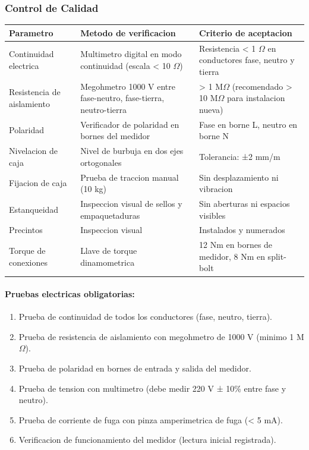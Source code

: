 \subsubsection{Control de Calidad}

\begin{longtable}{L{4.5cm} L{4.5cm} L{4.5cm}}
\toprule
\textbf{Parametro} & \textbf{Metodo de verificacion} & \textbf{Criterio de aceptacion} \\
\midrule
Continuidad electrica & Multimetro digital en modo continuidad (escala < 10 $\Omega$) & Resistencia < 1 $\Omega$ en conductores fase, neutro y tierra \\
Resistencia de aislamiento & Megohmetro 1000 V entre fase-neutro, fase-tierra, neutro-tierra & > 1 M$\Omega$ (recomendado > 10 M$\Omega$ para instalacion nueva) \\
Polaridad & Verificador de polaridad en bornes del medidor & Fase en borne L, neutro en borne N \\
Nivelacion de caja & Nivel de burbuja en dos ejes ortogonales & Tolerancia: ±2 mm/m \\
Fijacion de caja & Prueba de traccion manual (10 kg) & Sin desplazamiento ni vibracion \\
Estanqueidad & Inspeccion visual de sellos y empaquetaduras & Sin aberturas ni espacios visibles \\
Precintos & Inspeccion visual & Instalados y numerados \\
Torque de conexiones & Llave de torque dinamometrica & 12 Nm en bornes de medidor, 8 Nm en split-bolt \\
\bottomrule
\end{longtable}

\paragraph{Pruebas electricas obligatorias:}
\begin{enumerate}
  \item Prueba de continuidad de todos los conductores (fase, neutro, tierra).
  \item Prueba de resistencia de aislamiento con megohmetro de 1000 V (minimo 1 M$\Omega$).
  \item Prueba de polaridad en bornes de entrada y salida del medidor.
  \item Prueba de tension con multimetro (debe medir 220 V ± 10\% entre fase y neutro).
  \item Prueba de corriente de fuga con pinza amperimetrica de fuga (< 5 mA).
  \item Verificacion de funcionamiento del medidor (lectura inicial registrada).
\end{enumerate}

